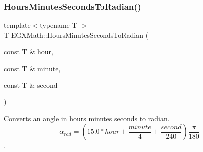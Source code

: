\mbox{\label{group___e_g_x_math-_angle_conversions-_hours_minutes_seconds_gaa0b04e9012ec739df1464298971e3be7}} 
\subsubsection{\texorpdfstring{Hours\+Minutes\+Seconds\+To\+Radian()}{HoursMinutesSecondsToRadian()}}
{\footnotesize\ttfamily template$<$typename T $>$ \\
T E\+G\+X\+Math\+::\+Hours\+Minutes\+Seconds\+To\+Radian (\begin{DoxyParamCaption}\item[{const T \&}]{hour,  }\item[{const T \&}]{minute,  }\item[{const T \&}]{second }\end{DoxyParamCaption})}



Converts an angle in hours minutes seconds to radian. \[\alpha_{rad}=(15.0 * hour + \frac{minute}{4} + \frac{second}{240})\frac{\pi}{180}\]. 

